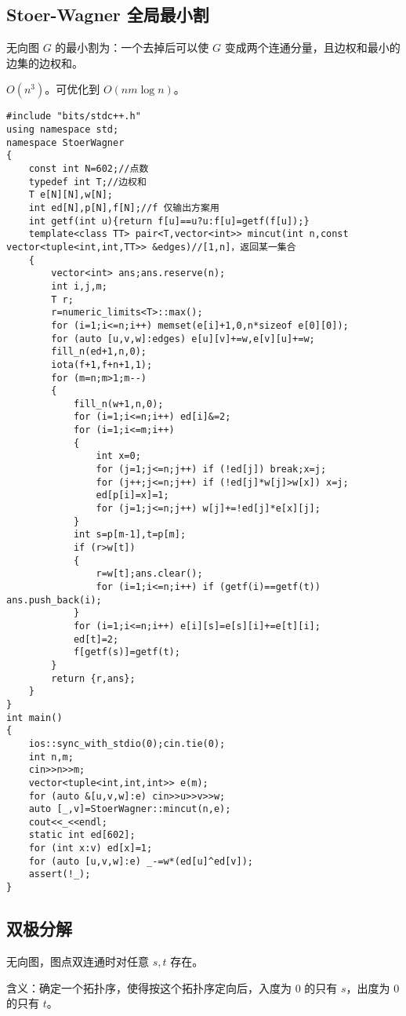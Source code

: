 \documentclass[12pt]{ctexart}
\begin{document}
\subsection{Stoer-Wagner 全局最小割}

无向图 $G$ 的最小割为：一个去掉后可以使 $G$ 变成两个连通分量，且边权和最小的边集的边权和。

$O(n^3)$。可优化到 $O(nm\log n)$。

\begin{lstlisting}
#include "bits/stdc++.h"
using namespace std;
namespace StoerWagner
{
	const int N=602;//点数
	typedef int T;//边权和
	T e[N][N],w[N];
	int ed[N],p[N],f[N];//f 仅输出方案用
	int getf(int u){return f[u]==u?u:f[u]=getf(f[u]);}
	template<class TT> pair<T,vector<int>> mincut(int n,const vector<tuple<int,int,TT>> &edges)//[1,n]，返回某一集合
	{
		vector<int> ans;ans.reserve(n);
		int i,j,m;
		T r;
		r=numeric_limits<T>::max();
		for (i=1;i<=n;i++) memset(e[i]+1,0,n*sizeof e[0][0]);
		for (auto [u,v,w]:edges) e[u][v]+=w,e[v][u]+=w;
		fill_n(ed+1,n,0);
		iota(f+1,f+n+1,1);
		for (m=n;m>1;m--)
		{
			fill_n(w+1,n,0);
			for (i=1;i<=n;i++) ed[i]&=2;
			for (i=1;i<=m;i++)
			{
				int x=0;
				for (j=1;j<=n;j++) if (!ed[j]) break;x=j;
				for (j++;j<=n;j++) if (!ed[j]*w[j]>w[x]) x=j;
				ed[p[i]=x]=1;
				for (j=1;j<=n;j++) w[j]+=!ed[j]*e[x][j];
			}
			int s=p[m-1],t=p[m];
			if (r>w[t])
			{
				r=w[t];ans.clear();
				for (i=1;i<=n;i++) if (getf(i)==getf(t)) ans.push_back(i);
			}
			for (i=1;i<=n;i++) e[i][s]=e[s][i]+=e[t][i];
			ed[t]=2;
			f[getf(s)]=getf(t);
		}
		return {r,ans};
	}
}
int main()
{
	ios::sync_with_stdio(0);cin.tie(0);
	int n,m;
	cin>>n>>m;
	vector<tuple<int,int,int>> e(m);
	for (auto &[u,v,w]:e) cin>>u>>v>>w;
	auto [_,v]=StoerWagner::mincut(n,e);
	cout<<_<<endl;
	static int ed[602];
	for (int x:v) ed[x]=1;
	for (auto [u,v,w]:e) _-=w*(ed[u]^ed[v]);
	assert(!_);
}
\end{lstlisting}


\subsection{双极分解}

无向图，图点双连通时对任意 $s,t$ 存在。

含义：确定一个拓扑序，使得按这个拓扑序定向后，入度为 $0$ 的只有 $s$，出度为 $0$ 的只有 $t$。
\end{document}
